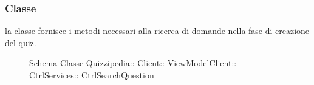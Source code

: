 \subsubsection{Classe }
la classe fornisce i metodi necessari alla ricerca di domande nella fase di creazione del quiz.
\begin{figure}[H]
\centering
\noindent{}
\caption[Schema Classe CtrlSearchQuestion]{Schema Classe Quizzipedia:: Client:: ViewModelClient:: CtrlServices:: CtrlSearchQuestion}
\end{figure}
